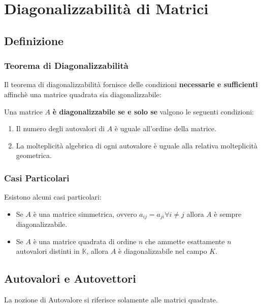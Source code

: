 \chapter{Diagonalizzabilità di Matrici}
\section{Definizione}
\subsection{Teorema di Diagonalizzabilità}
Il teorema di diagonalizzabilità fornisce delle condizioni \textbf{necessarie e sufficienti} affinchè una matrice quadrata sia diagonalizzabile:

Una matrice $A$ \textbf{è diagonalizzabile se e solo se} valgono le seguenti condizioni:
\begin{enumerate}
    \item Il numero degli autovalori di $A$ è uguale all'ordine della matrice.
    \item La molteplicità algebrica di ogni autovalore è uguale alla relativa molteplicità geometrica.
\end{enumerate}

\subsection{Casi Particolari}
Esistono alcuni casi particolari:
\begin{itemize}
    \item Se $A$ è una matrice simmetrica, ovvero $a_{ij}=a_{ji} \forall i \neq j$ allora $A$ è sempre diagonalizzabile.
    \item Se $A$ è una matrice quadrata di ordine $n$ che ammette esattamente $n$ autovalori distinti in $\mathbb{K}$, allora $A$ è diagonalizzabile nel campo $K$.
\end{itemize}

\section{Autovalori e Autovettori}
La nozione di Autovalore si riferisce solamente alle matrici quadrate.
